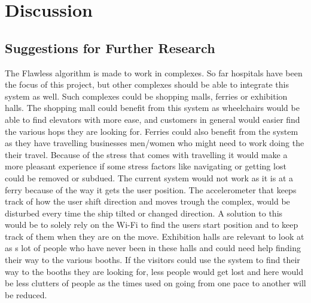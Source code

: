 \chapter{Discussion}

\section{Suggestions for Further Research}
The Flawless algorithm is made to work in complexes. So far hospitals have been the focus of this project, but other complexes should be able to integrate this system as well. Such complexes could be shopping malls, ferries or exhibition halls. The shopping mall could benefit from this system as wheelchairs would be able to find elevators with more ease, and customers in general would easier find the various hops they are looking for. Ferries could also benefit from the system as they have travelling businesses men/women who might need to work doing the their travel. Because of the stress that comes with travelling\cite{future_stress} it would make a more pleasant experience if some stress factors like navigating or getting lost could be removed or subdued. The current system would not work as it is at a ferry because of the way it gets the user position. The accelerometer that keeps track of how the user shift direction and moves trough the complex, would be disturbed every time the ship tilted or changed direction. A solution to this would be to solely rely on the Wi-Fi to find the users start position and to keep track of them when they are on the move. Exhibition halls are relevant to look at as s lot of people who have never been in these halls and could need help finding their way to the various booths. If the visitors could use the system to find their way to the booths they are looking for, less people would get lost and here would be less clutters of people as the times used on going from one pace to another will be reduced.